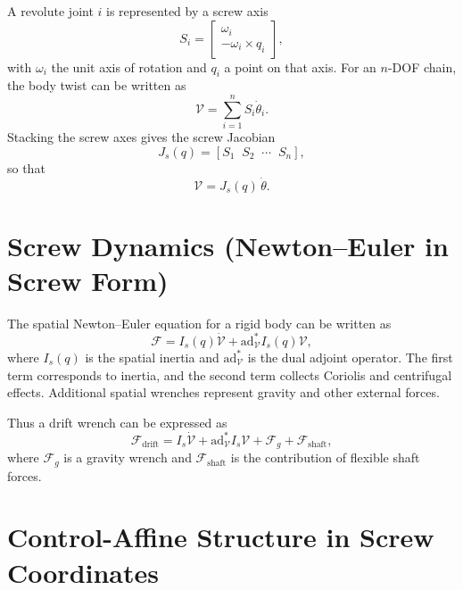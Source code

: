 \documentclass[12pt]{article}
\begin{document}
A revolute joint $i$ is represented by a screw axis
\begin{equation}
S_i =
\begin{bmatrix}
\omega_i \\ -\omega_i \times q_i
\end{bmatrix},
\end{equation}
with $\omega_i$ the unit axis of rotation and $q_i$ a point on that axis. For an $n$-DOF chain, the body twist can be written as
\begin{equation}
\mathcal{V} = \sum_{i=1}^n S_i \dot{\theta}_i.
\end{equation}
Stacking the screw axes gives the screw Jacobian
\begin{equation}
J_s(q) = [S_1 \;\; S_2 \;\; \cdots \;\; S_n],
\end{equation}
so that
\begin{equation}
\mathcal{V} = J_s(q)\,\dot{\theta}.
\end{equation}

\section{Screw Dynamics (Newton--Euler in Screw Form)}

The spatial Newton--Euler equation for a rigid body can be written as
\begin{equation}
\mathcal{F} =
I_s(q)\dot{\mathcal{V}}
+
\mathrm{ad}^\ast_{\mathcal{V}} I_s(q)\mathcal{V},
\end{equation}
where $I_s(q)$ is the spatial inertia and $\mathrm{ad}^\ast_{\mathcal{V}}$ is the dual adjoint operator. The first term corresponds to inertia, and the second term collects Coriolis and centrifugal effects. Additional spatial wrenches represent gravity and other external forces.

Thus a drift wrench can be expressed as
\begin{equation}
\mathcal{F}_{\mathrm{drift}}
=
I_s\dot{\mathcal{V}}
+
\mathrm{ad}^\ast_{\mathcal{V}} I_s \mathcal{V}
+
\mathcal{F}_{g}
+
\mathcal{F}_{\mathrm{shaft}},
\end{equation}
where $\mathcal{F}_g$ is a gravity wrench and $\mathcal{F}_{\mathrm{shaft}}$ is the contribution of flexible shaft forces.

\section{Control-Affine Structure in Screw Coordinates}
\end{document}

